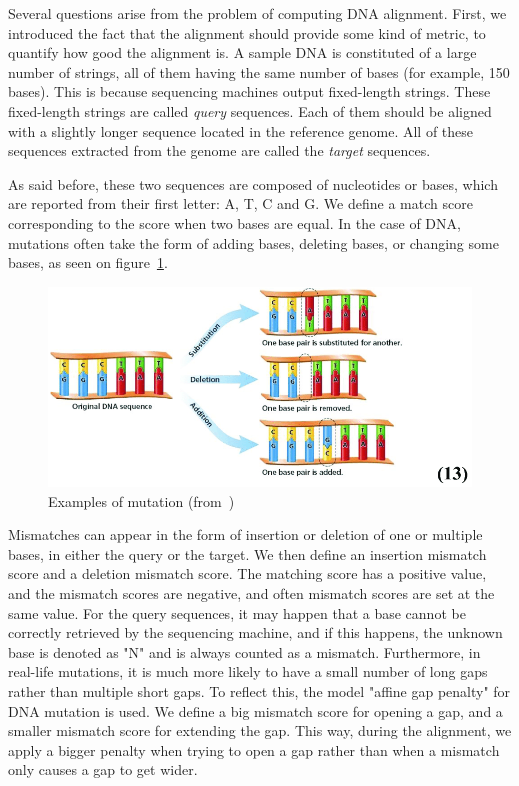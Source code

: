Several questions arise from the problem of computing DNA alignment. First, we introduced the fact that the alignment should provide some kind of metric, to quantify how good the alignment is. A sample DNA is constituted of a large number of strings, all of them having the same number of bases (for example, 150 bases). This is because sequencing machines output fixed-length strings. These fixed-length strings are called \emph{query} sequences. Each of them should be aligned with a slightly longer sequence located in the reference genome. All of these sequences extracted from the genome are called the \emph{target} sequences.

As said before, these two sequences are composed of nucleotides or bases, which are reported from their first letter: A, T, C and G. We define a match score corresponding to the score when two bases are equal. In the case of DNA, mutations often take the form of adding bases, deleting bases, or changing some bases, as seen on figure~\ref{fig:mutation}. 
\begin{figure}[h!]
	\centering
	\includegraphics[width=1\linewidth]{mutation}
	\caption{Examples of mutation (from~\cite{alasadi:chemistry})}
	\label{fig:mutation}
\end{figure}
Mismatches can appear in the form of insertion or deletion of one or multiple bases, in either the query or the target. We then define an insertion mismatch score and a deletion mismatch score. The matching score has a positive value, and the mismatch scores are negative, and often mismatch scores are set at the same value. For the query sequences, it may happen that a base cannot be correctly retrieved by the sequencing machine, and if this happens, the unknown base is denoted as "N" and is always counted as a mismatch. Furthermore, in real-life mutations, it is much more likely to have a small number of long gaps rather than multiple short gaps. To reflect this, the model "affine gap penalty" for DNA mutation is used. We define a big mismatch score for opening a gap, and a smaller mismatch score for extending the gap. This way, during the alignment, we apply a bigger penalty when trying to open a gap rather than when a mismatch only causes a gap to get wider. 


